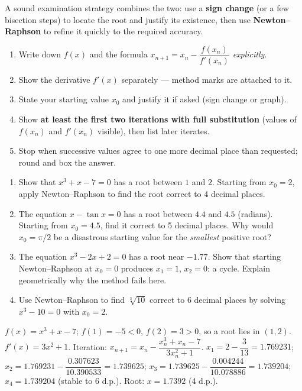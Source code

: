 \documentclass[11pt]{article}
\begin{document}
A sound examination strategy combines the two: use a \textbf{sign change} (or a few bisection steps) to locate the root and justify its existence, then use \textbf{Newton--Raphson} to refine it quickly to the required accuracy.

\begin{methode}
\begin{enumerate}
  \item Write down $f(x)$ and the formula $x_{n+1} = x_n - \dfrac{f(x_n)}{f'(x_n)}$ \emph{explicitly}.
  \item Show the derivative $f'(x)$ separately --- method marks are attached to it.
  \item State your starting value $x_0$ and justify it if asked (sign change or graph).
  \item Show \textbf{at least the first two iterations with full substitution} (values of $f(x_n)$ and $f'(x_n)$ visible), then list later iterates.
  \item Stop when successive values agree to one more decimal place than requested; round and box the answer.
\end{enumerate}
\end{methode}

\begin{exercice}[Practice]
\begin{enumerate}
  \item Show that $x^3 + x - 7 = 0$ has a root between $1$ and $2$. Starting from $x_0 = 2$, apply Newton--Raphson to find the root correct to 4 decimal places.
  \item The equation $x - \tan x = 0$ has a root between $4.4$ and $4.5$ (radians). Starting from $x_0 = 4.5$, find it correct to 5 decimal places. Why would $x_0 = \pi/2$ be a disastrous starting value for the \emph{smallest} positive root?
  \item The equation $x^3 - 2x + 2 = 0$ has a root near $-1.77$. Show that starting Newton--Raphson at $x_0 = 0$ produces $x_1 = 1$, $x_2 = 0$: a cycle. Explain geometrically why the method fails here.
  \item Use Newton--Raphson to find $\sqrt[3]{10}$ correct to 6 decimal places by solving $x^3 - 10 = 0$ with $x_0 = 2$.
\end{enumerate}
\end{exercice}

\begin{corrige}[Exercise 1]
$f(x)=x^3+x-7$; $f(1)=-5<0$, $f(2)=3>0$, so a root lies in $(1,2)$. $f'(x)=3x^2+1$. Iteration: $x_{n+1}=x_n-\dfrac{x_n^3+x_n-7}{3x_n^2+1}$.
$x_1 = 2 - \dfrac{3}{13} = 1.769231$; $x_2 = 1.769231 - \dfrac{0.307623}{10.390533} = 1.739625$; $x_3 = 1.739625 - \dfrac{0.004244}{10.078886} = 1.739204$; $x_4 = 1.739204$ (stable to 6 d.p.). Root: $x = 1.7392$ (4 d.p.).
\end{corrige}
\end{document}
